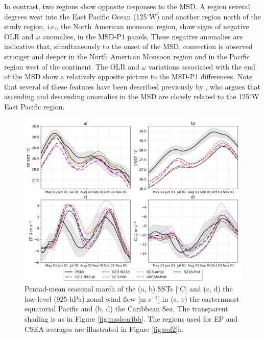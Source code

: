  In contrast, two regions show opposite responses to the MSD. A region several degrees west into the East Pacific Ocean (125$^\circ$W) and another region north of the study region, i.e., the North American monsoon region, show signs of negative OLR and $\omega$ anomalies, in the MSD-P1 panels. These negative anomalies are indicative that, simultaneously to the onset of the MSD,  convection is observed stronger and deeper in the North American Monsoon region and in the Pacific region west of the continent.  
 The OLR and $\omega$ variations associated with the end of the MSD show a relatively opposite picture to the MSD-P1 differences. Note that several of these features have been described previously by \cite{herrera2015}, who argues that ascending and descending anomalies in the MSD are closely related to the 125$^\circ$W East Pacific region.
 
 \begin{figure}[t!]
\includegraphics[width=\linewidth]{figures/index_seasonal}
\caption[Seasonal cycle of East Pacific and Caribbean SSTs and zonal winds.]{Pentad-mean seasonal march of the (a, b) SSTs [$^\circ$C] and (c, d) the low-level (925-hPa) zonal wind flow [m s$^{-1}$] in (a, c) the easternmost equatorial Pacific and (b, d) the Caribbean Sea. The transparent shading is as in Figure \ref{fig:msdcaribb}. The regions used for EP and CSEA averages are illustrated in Figure \ref{fig:eof2}h.}
\label{fig:csst}
\end{figure}
 


